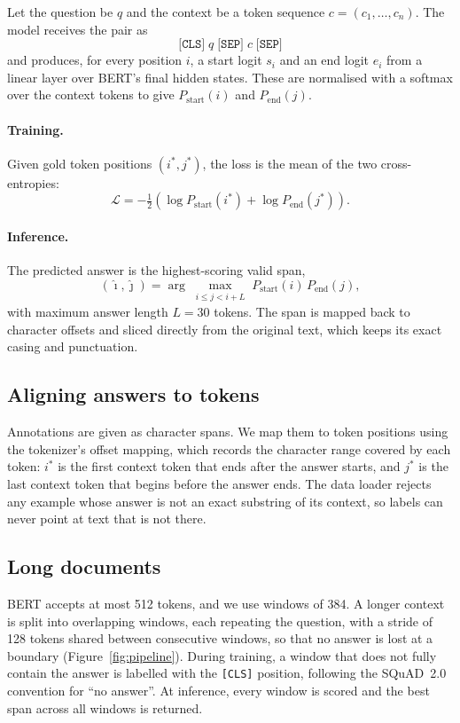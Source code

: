 \documentclass[11pt,a4paper]{article}
\begin{document}
Let the question be $q$ and the context be a token sequence $c = (c_1, \dots, c_n)$. The model receives the pair as
\[
  \texttt{[CLS]}\; q \;\texttt{[SEP]}\; c \;\texttt{[SEP]}
\]
and produces, for every position $i$, a start logit $s_i$ and an end logit $e_i$ from a linear layer over BERT's final hidden states. These are normalised with a softmax over the context tokens to give $P_{\text{start}}(i)$ and $P_{\text{end}}(j)$.

\paragraph{Training.} Given gold token positions $(i^\ast, j^\ast)$, the loss is the mean of the two cross-entropies:
\[
  \mathcal{L} = -\tfrac{1}{2}\left(\log P_{\text{start}}(i^\ast) + \log P_{\text{end}}(j^\ast)\right).
\]

\paragraph{Inference.} The predicted answer is the highest-scoring valid span,
\[
  (\hat\imath, \hat\jmath) = \arg\max_{\substack{i \le j < i + L}} P_{\text{start}}(i)\, P_{\text{end}}(j),
\]
with maximum answer length $L = 30$ tokens. The span is mapped back to character offsets and sliced directly from the original text, which keeps its exact casing and punctuation.

\subsection{Aligning answers to tokens}

Annotations are given as character spans. We map them to token positions using the tokenizer's offset mapping, which records the character range covered by each token: $i^\ast$ is the first context token that ends after the answer starts, and $j^\ast$ is the last context token that begins before the answer ends. The data loader rejects any example whose answer is not an exact substring of its context, so labels can never point at text that is not there.

\subsection{Long documents}

BERT accepts at most 512 tokens, and we use windows of 384. A longer context is split into overlapping windows, each repeating the question, with a stride of 128 tokens shared between consecutive windows, so that no answer is lost at a boundary (Figure~\ref{fig:pipeline}). During training, a window that does not fully contain the answer is labelled with the \texttt{[CLS]} position, following the SQuAD~2.0 convention for ``no answer''. At inference, every window is scored and the best span across all windows is returned.
\end{document}
